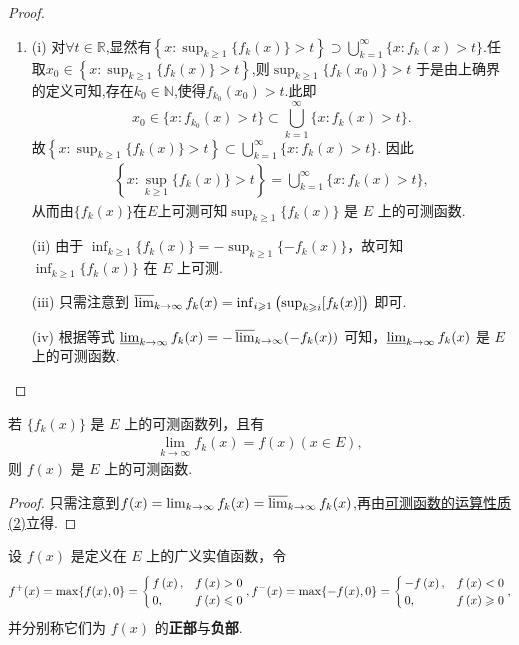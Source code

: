 \documentclass[../../main.tex]{subfiles}%
\begin{document}
\begin{proof}
\begin{enumerate}[(1)]
\item (i) 对$\forall t \in \mathbb{R}$,显然有$\left\{x: \sup_{k \geqslant 1}\{f_k(x)\} > t\right\} \supset \bigcup_{k = 1}^{\infty}\{x: f_k(x) > t\}.$任取$x_0\in \left\{x: \sup_{k \geqslant 1}\{f_k(x)\} > t\right\}$,则$ \sup_{k \geqslant 1}\{f_k(x_0)\} > t$
于是由上确界的定义可知,存在$k_0\in \mathbb{N}$,使得$f_{k_0}(x_0)>t$.此即$$x_0\in \{x: f_{k_0}(x) > t\}\subset \bigcup_{k = 1}^{\infty}\{x: f_k(x) > t\}.$$
故$\left\{x: \sup_{k \geqslant 1}\{f_k(x)\} > t\right\} \subset \bigcup_{k = 1}^{\infty}\{x: f_k(x) > t\}.$
因此
\begin{align*}
\left\{x: \sup_{k \geqslant 1}\{f_k(x)\} > t\right\} = \bigcup_{k = 1}^{\infty}\{x: f_k(x) > t\},
\end{align*}
从而由$\{f_k(x)\}$在$E$上可测可知\(\sup_{k \geqslant 1}\{f_k(x)\}\) 是 \(E\) 上的可测函数.

(ii) 由于 \(\inf_{k \geqslant 1}\{f_k(x)\} = -\sup_{k \geqslant 1}\{-f_k(x)\}\)，故可知 \(\inf_{k \geqslant 1}\{f_k(x)\}\) 在 \(E\) 上可测.

(iii) 只需注意到 \(\varlimsup_{k \to \infty} f_k(x) = \inf_{i \geqslant 1}\left(\sup_{k \geqslant i}[f_k(x)]\right)\) 即可.

(iv) 根据等式 \(\varliminf_{k \to \infty} f_k(x) = -\varlimsup_{k \to \infty}(-f_k(x))\) 可知，\(\varliminf_{k \to \infty} f_k(x)\) 是 \(E\) 上的可测函数. 
\end{enumerate}
\end{proof}

\begin{corollary}\label{corollary:可测函数列的极限也可测}
若 \(\{f_k(x)\}\) 是 \(E\) 上的可测函数列，且有
\begin{align*}
\lim_{k \to \infty}f_k(x) = f(x) (x \in E),
\end{align*}
则 \(f(x)\) 是 \(E\) 上的可测函数. 
\end{corollary}
\begin{proof}
只需注意到$f(x)=\lim_{k\to \infty}f_k(x)=\varlimsup_{k\to \infty}f_k(x)$,再由\hyperref[theorem:可测函数的运算性质]{可测函数的运算性质(2)}立得.
\end{proof}

\begin{definition}[函数的正部和负部]
设 \(f(x)\) 是定义在 \(E\) 上的广义实值函数，令
\[
f^+(x)=\max \{f(x),0\}=\begin{cases}
f\left( x \right) ,&f\left( x \right) >0\\
0,&f\left( x \right) \leqslant 0\\
\end{cases},
\\
f^-(x)=\max \{-f(x),0\}=\begin{cases}
-f\left( x \right) ,&f\left( x \right) <0\\
0,&f\left( x \right) \geqslant 0\\
\end{cases},
\]
并分别称它们为 \(f(x)\) 的\textbf{正部}与\textbf{负部}.
\end{definition}
\end{document}
